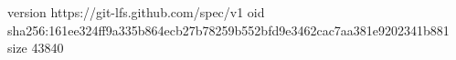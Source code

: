 version https://git-lfs.github.com/spec/v1
oid sha256:161ee324ff9a335b864ecb27b78259b552bfd9e3462cac7aa381e9202341b881
size 43840
